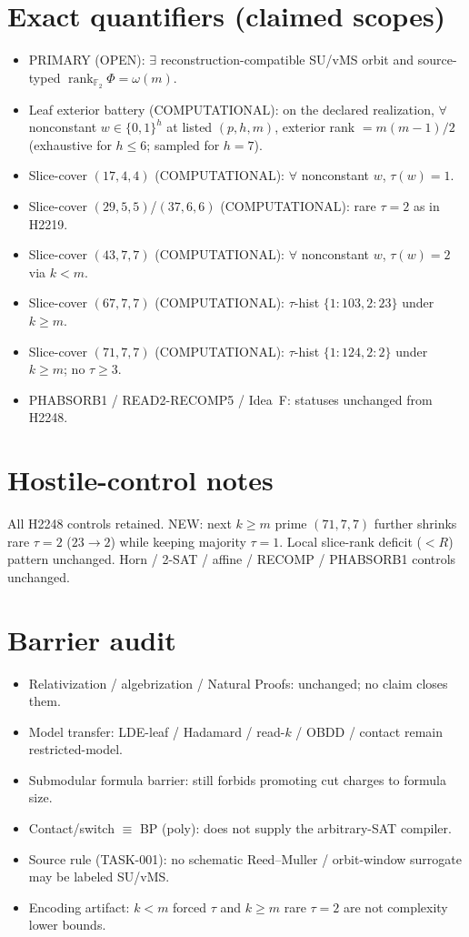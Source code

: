\documentclass[11pt]{article}
\begin{document}
\section*{Exact quantifiers (claimed scopes)}
\begin{itemize}
\item PRIMARY (OPEN): $\exists$ reconstruction-compatible SU/vMS orbit and source-typed
  $\operatorname{rank}_{\mathbb F_2}\Phi=\omega(m)$.
\item Leaf exterior battery (COMPUTATIONAL): on the declared realization, $\forall$ nonconstant
  $w\in\{0,1\}^h$ at listed $(p,h,m)$, exterior rank $=m(m-1)/2$
  (exhaustive for $h\le6$; sampled for $h{=}7$).
\item Slice-cover $(17,4,4)$ (COMPUTATIONAL): $\forall$ nonconstant $w$, $\tau(w)=1$.
\item Slice-cover $(29,5,5)$/$(37,6,6)$ (COMPUTATIONAL): rare $\tau{=}2$ as in H2219.
\item Slice-cover $(43,7,7)$ (COMPUTATIONAL): $\forall$ nonconstant $w$, $\tau(w)=2$ via $k{<}m$.
\item Slice-cover $(67,7,7)$ (COMPUTATIONAL): $\tau$-hist $\{1{:}103,2{:}23\}$ under $k{\ge}m$.
\item Slice-cover $(71,7,7)$ (COMPUTATIONAL): $\tau$-hist $\{1{:}124,2{:}2\}$ under $k{\ge}m$;
  no $\tau{\ge}3$.
\item PHABSORB1 / READ2-RECOMP5 / Idea~F: statuses unchanged from H2248.
\end{itemize}

\section*{Hostile-control notes}
All H2248 controls retained. NEW: next $k{\ge}m$ prime $(71,7,7)$ further shrinks rare
$\tau{=}2$ ($23\to2$) while keeping majority $\tau{=}1$. Local slice-rank deficit ($<R$) pattern
unchanged. Horn / 2-SAT / affine / RECOMP / PHABSORB1 controls unchanged.

\section*{Barrier audit}
\begin{itemize}
\item Relativization / algebrization / Natural Proofs: unchanged; no claim closes them.
\item Model transfer: LDE-leaf / Hadamard / read-$k$ / OBDD / contact remain restricted-model.
\item Submodular formula barrier: still forbids promoting cut charges to formula size.
\item Contact/switch $\equiv$ BP (poly): does not supply the arbitrary-SAT compiler.
\item Source rule (TASK-001): no schematic Reed--Muller / orbit-window surrogate may be labeled SU/vMS.
\item Encoding artifact: $k{<}m$ forced $\tau$ and $k{\ge}m$ rare $\tau{=}2$ are not complexity lower bounds.
\end{itemize}
\end{document}

